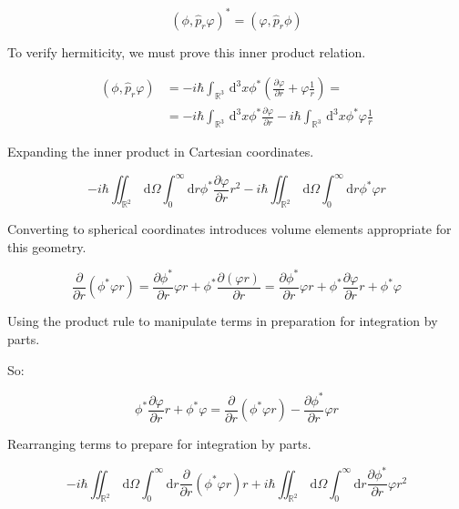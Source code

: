 \documentclass[italian]{HKNdocument}
\begin{document}
\begin{equation}
\left(\phi, \hat{p}_{r} \varphi\right)^{*}=\left(\varphi, \hat{p}_{r} \phi\right)
\end{equation}

To verify hermiticity, we must prove this inner product relation.

\begin{align}
\left(\phi, \hat{p}_{r} \varphi\right) & =-i \hbar \int_{\mathbb{R}^{3}} \, \mathrm{d}^{3} x \phi^{*}\left(\frac{\partial \varphi}{\partial r}+\varphi \frac{1}{r}\right)=  \\
& =-i \hbar \int_{\mathbb{R}^{3}} \, \mathrm{d}^{3} x \phi^{*} \frac{\partial \varphi}{\partial r}-i \hbar \int_{\mathbb{R}^{3}} \, \mathrm{d}^{3} x \phi^{*} \varphi \frac{1}{r}
\end{align}

Expanding the inner product in Cartesian coordinates.

\begin{equation}
-i \hbar \iint_{\mathbb{R}^{2}} \, \mathrm{d} \Omega \int_{0}^{\infty} \mathrm{d} r \phi^{*} \frac{\partial \varphi}{\partial r} r^{2}-i \hbar \iint_{\mathbb{R}^{2}} \, \mathrm{d} \Omega \int_{0}^{\infty} \mathrm{d} r \phi^{*} \varphi r
\end{equation}

Converting to spherical coordinates introduces volume elements appropriate for this geometry.

\begin{equation}
\frac{\partial}{\partial r}\left(\phi^{*} \varphi r\right)=\frac{\partial \phi^{*}}{\partial r} \varphi r+\phi^{*} \frac{\partial(\varphi r)}{\partial r}=\frac{\partial \phi^{*}}{\partial r} \varphi r+\phi^{*} \frac{\partial \varphi}{\partial r} r+\phi^{*} \varphi
\end{equation}

Using the product rule to manipulate terms in preparation for integration by parts.

So:

\begin{equation}
\phi^{*} \frac{\partial \varphi}{\partial r} r+\phi^{*} \varphi=\frac{\partial}{\partial r}\left(\phi^{*} \varphi r\right)-\frac{\partial \phi^{*}}{\partial r} \varphi r
\end{equation}

Rearranging terms to prepare for integration by parts.

\begin{equation}
-i \hbar \iint_{\mathbb{R}^{2}} \, \mathrm{d} \Omega \int_{0}^{\infty} \mathrm{d} r \frac{\partial}{\partial r}\left(\phi^{*} \varphi r\right) r+i \hbar \iint_{\mathbb{R}^{2}} \, \mathrm{d} \Omega \int_{0}^{\infty} \mathrm{d} r \frac{\partial \phi^{*}}{\partial r} \varphi r^{2}
\end{equation}
\end{document}
